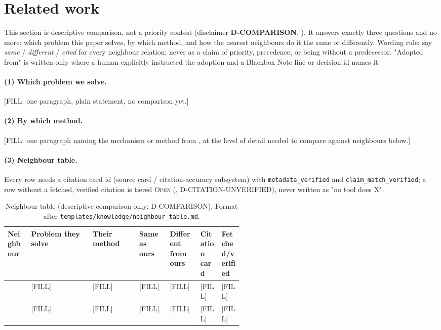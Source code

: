 \documentclass[10pt,twocolumn]{article}
\newcommand{\OpenTier}{\textsc{Open}}
\begin{document}
\section{Related work}
\label{sec:related}
This section is descriptive comparison, not a priority contest (disclaimer
\textbf{D-COMPARISON}, ). It answers exactly three
questions and no more: which problem this paper solves, by which method, and
how the nearest neighbours do it the same or differently. Wording rule: say
\emph{same} / \emph{different} / \emph{cited} for every neighbour relation;
never as a claim of priority, precedence, or being without a predecessor.
"Adopted from" is written only where a human explicitly instructed the
adoption and a Blackbox Note line or decision id names it.

\paragraph{(1) Which problem we solve.} [FILL: one paragraph, plain
statement, no comparison yet.]

\paragraph{(2) By which method.} [FILL: one paragraph naming the mechanism
or method from , at the level of detail needed to compare
against neighbours below.]

\paragraph{(3) Neighbour table.} Every row needs a citation card id (source
card / citation-accuracy subsystem) with \texttt{metadata\_verified} and
\texttt{claim\_match\_verified}; a row without a fetched, verified citation
is tiered \OpenTier{} (, D-CITATION-UNVERIFIED), never
written as "no tool does X".

\begin{table}[t]
\centering
\scriptsize
\begin{tabularx}{\linewidth}{@{}p{0.1\linewidth} X X p{0.13\linewidth} p{0.13\linewidth} p{0.09\linewidth} p{0.09\linewidth}@{}}
\toprule
\textbf{Neighbour} & \textbf{Problem they solve} & \textbf{Their method} & \textbf{Same as ours} & \textbf{Different from ours} & \textbf{Citation card} & \textbf{Fetched/verified} \\
\midrule
\citet{schaffer2005contrastive} & [FILL] & [FILL] & [FILL] & [FILL] & [FILL] & [FILL] \\
\citet{jaakkola2020designing} & [FILL] & [FILL] & [FILL] & [FILL] & [FILL] & [FILL] \\
\bottomrule
\end{tabularx}
\caption{Neighbour table (descriptive comparison only;  D-COMPARISON). Format after \texttt{templates/knowledge/neighbour\_table.md}.}
\label{tab:neighbours}
\end{table}
\end{document}
